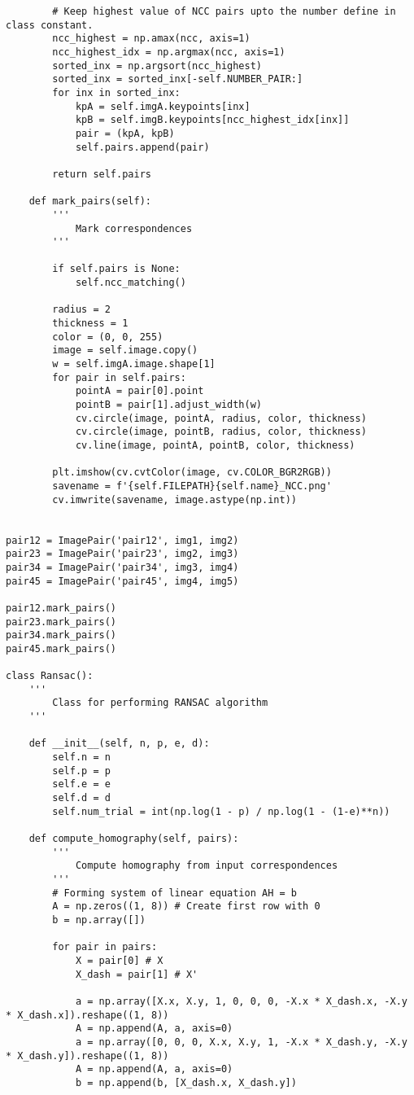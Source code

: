 \documentclass[11pt]{article}
\begin{document}
\begin{lstlisting}
        # Keep highest value of NCC pairs upto the number define in class constant. 
        ncc_highest = np.amax(ncc, axis=1)
        ncc_highest_idx = np.argmax(ncc, axis=1)
        sorted_inx = np.argsort(ncc_highest)
        sorted_inx = sorted_inx[-self.NUMBER_PAIR:]
        for inx in sorted_inx:
            kpA = self.imgA.keypoints[inx]
            kpB = self.imgB.keypoints[ncc_highest_idx[inx]]
            pair = (kpA, kpB)
            self.pairs.append(pair)
        
        return self.pairs

    def mark_pairs(self):
        '''
            Mark correspondences
        '''

        if self.pairs is None:
            self.ncc_matching()

        radius = 2
        thickness = 1
        color = (0, 0, 255)
        image = self.image.copy()
        w = self.imgA.image.shape[1]
        for pair in self.pairs:
            pointA = pair[0].point
            pointB = pair[1].adjust_width(w)
            cv.circle(image, pointA, radius, color, thickness)
            cv.circle(image, pointB, radius, color, thickness)
            cv.line(image, pointA, pointB, color, thickness)

        plt.imshow(cv.cvtColor(image, cv.COLOR_BGR2RGB))
        savename = f'{self.FILEPATH}{self.name}_NCC.png'
        cv.imwrite(savename, image.astype(np.int))


pair12 = ImagePair('pair12', img1, img2)
pair23 = ImagePair('pair23', img2, img3)
pair34 = ImagePair('pair34', img3, img4)
pair45 = ImagePair('pair45', img4, img5)

pair12.mark_pairs()
pair23.mark_pairs()
pair34.mark_pairs()
pair45.mark_pairs()

class Ransac():
    '''
        Class for performing RANSAC algorithm
    '''

    def __init__(self, n, p, e, d):
        self.n = n
        self.p = p
        self.e = e
        self.d = d
        self.num_trial = int(np.log(1 - p) / np.log(1 - (1-e)**n))

    def compute_homography(self, pairs):
        '''
            Compute homography from input correspondences
        '''
        # Forming system of linear equation AH = b
        A = np.zeros((1, 8)) # Create first row with 0
        b = np.array([])

        for pair in pairs:
            X = pair[0] # X
            X_dash = pair[1] # X'

            a = np.array([X.x, X.y, 1, 0, 0, 0, -X.x * X_dash.x, -X.y * X_dash.x]).reshape((1, 8))
            A = np.append(A, a, axis=0)
            a = np.array([0, 0, 0, X.x, X.y, 1, -X.x * X_dash.y, -X.y * X_dash.y]).reshape((1, 8))
            A = np.append(A, a, axis=0)
            b = np.append(b, [X_dash.x, X_dash.y])


\end{lstlisting}
\end{document}
